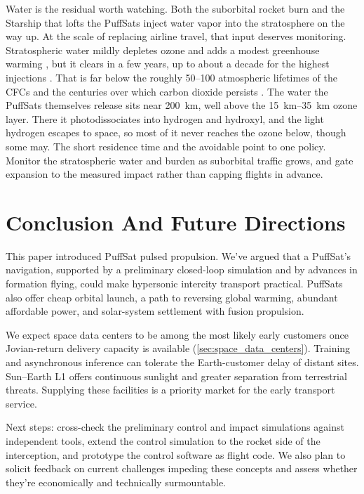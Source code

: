 \documentclass{article}
\begin{document}
Water is the residual worth watching. Both the suborbital rocket burn and the Starship that lofts the PuffSats inject water vapor into the stratosphere on the way up. At the scale of replacing airline travel, that input deserves monitoring. Stratospheric water mildly depletes ozone \cite{ryan2022rocket} and adds a modest greenhouse warming \cite{solomon2010stratospheric}, but it clears in a few years, up to about a decade for the highest injections \cite{hunga2026residence}. That is far below the roughly \SIrange{50}{100}{\year} atmospheric lifetimes of the CFCs \cite{wmo2022ozone} and the centuries over which carbon dioxide persists \cite{ipcc2021ar6}. The water the PuffSats themselves release sits near \SI{200}{\kilo\meter}, well above the \SIrange{15}{35}{\kilo\meter} ozone layer. There it photodissociates into hydrogen and hydroxyl, and the light hydrogen escapes to space, so most of it never reaches the ozone below, though some may. The short residence time and the avoidable  point to one policy. Monitor the stratospheric water and  burden as suborbital traffic grows, and gate expansion to the measured impact rather than capping flights in advance.

\section{Conclusion And Future Directions}
This paper introduced PuffSat pulsed propulsion. We've argued that a PuffSat's navigation, supported by a preliminary closed-loop simulation \cite{Katz_puffsat_control_sim_2026} and by advances in formation flying, could make hypersonic intercity transport practical. PuffSats also offer cheap orbital launch, a path to reversing global warming, abundant affordable power, and solar-system settlement with fusion propulsion.

We expect space data centers to be among the most likely early customers once Jovian-return delivery capacity is available (\autoref{sec:space_data_centers}). Training and asynchronous inference can tolerate the Earth-customer delay of distant sites. Sun--Earth L1 offers continuous sunlight and greater separation from terrestrial threats. Supplying these facilities is a priority market for the early transport service.

Next steps: cross-check the preliminary control and impact simulations against independent tools, extend the control simulation to the rocket side of the interception, and prototype the control software as flight code. We also plan to solicit feedback on current challenges impeding these concepts and assess whether they're economically and technically surmountable.
\end{document}
